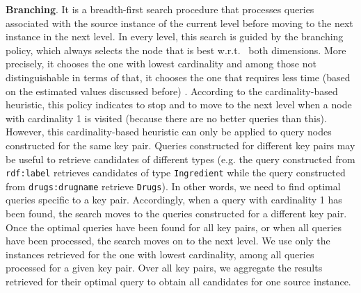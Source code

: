 \textbf{Branching}. It is a breadth-first search procedure that processes queries associated with the source instance of the current level before moving to the next instance in the next level. In every level, this search is guided by the branching policy, which always selects the node that is best w.r.t.~ both dimensions. More precisely, it chooses the one with lowest cardinality and among those not distinguishable in terms of that, it chooses the one that requires less time (based on the estimated values discussed before) . According to the cardinality-based heuristic, this policy indicates to stop and to move to the next level when a node with cardinality 1 is visited (because there are no better queries than this). However, this cardinality-based heuristic can only be applied to query nodes constructed for the same key pair. Queries constructed for different key pairs may be useful to retrieve candidates of different types (e.g. the query constructed from \verb+rdf:label+ retrieves candidates of type \verb+Ingredient+ while the query constructed from \verb+drugs:drugname+ retrieve \verb+Drugs+). In other words, we need to find optimal queries specific to a key pair. Accordingly, when a query with cardinality 1 has been found, the search moves to the queries constructed for a different key pair. 
Once the optimal queries have been found for all key pairs, or when all queries have been processed, the search moves on to the next level. We use only the instances retrieved for the one with lowest cardinality, among all queries processed for a given key pair. Over all key pairs, we aggregate the results retrieved for their optimal query to obtain all candidates for one source instance. 
 

